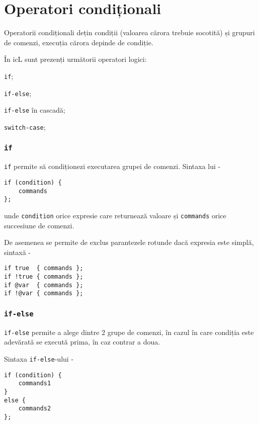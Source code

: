 \section{Operatori condiționali}

Operatorii condiționali dețin condiții (valoarea cărora trebuie socotită) și grupuri de comenzi, execuția cărora depinde de condiție.

În icL sunt prezenți următorii operatori logici:
\begin{icItems}
	\item \texttt{if};
	\item \texttt{if-else};
	\item \texttt{if-else} în cascadă;
	\item \texttt{switch-case};
\end{icItems}

\subsubsection{\texttt{if}}

\texttt{if} permite să condiționezi executarea grupei de comenzi. Sintaxa lui -
\begin{verbatim}
if (condition) {
	commands
};
\end{verbatim}
unde \texttt{condition} orice expresie care returnează valoare \bool{} și \texttt{commands} orice succesiune de comenzi.

De asemenea se permite de exclus parantezele rotunde dacă expresia este simplă, sintaxă -
\begin{verbatim}
if true  { commands };
if !true { commands };
if @var  { commands };
if !@var { commands };
\end{verbatim}

\subsubsection{\texttt{if-else}}

\texttt{if-else} permite a alege dintre 2 grupe de comenzi, în cazul în care condiția este adevărată se execută prima, în caz contrar a doua.

Sintaxa \texttt{if-else}-ului -
\begin{verbatim}
if (condition) {
	commands1
}
else {
	commands2
};
\end{verbatim}

